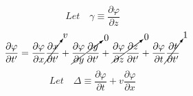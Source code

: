\documentclass[journal]{IEEEtran}
\begin{document}
\begin{equation}
\boxed{
Let\quad\gamma\equiv\frac{\partial\varphi}{\partial z}
}
\end{equation}
\begin{equation}
\frac{\partial\varphi}{\partial t^{\prime}} =
\frac{\partial\varphi}{\partial x}\cancelto{v}{\frac{\partial x}
{\partial t^\prime}} +
\cancelto{0}{\frac{\partial\varphi}{\partial y}\frac{\partial y}
{\partial t^{\prime}}} +
\cancelto{0}{\frac{\partial\varphi}{\partial z}\frac{\partial z}
{\partial t^{\prime}}} +
\frac{\partial\varphi}{\partial t}\cancelto{1}{\frac{\partial t}
{\partial t^{\prime}}}
\end{equation}
\begin{equation}
\boxed{
Let\quad\Delta\equiv\frac{\partial\varphi}{\partial t} +
v\frac{\partial\varphi}{\partial x}
}
\end{equation}
\end{document}
